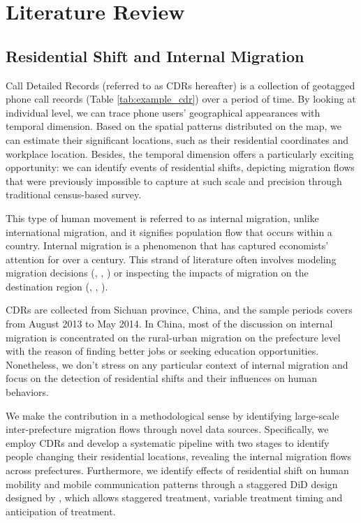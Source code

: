 \chapter{Literature Review}
\section{Residential Shift and Internal Migration}
Call Detailed Records (referred to as CDRs hereafter) is a collection of geotagged phone call records (Table \ref{tab:example_cdr}) over a period of time.
By looking at individual level, we can trace phone users' geographical appearances with temporal dimension.
Based on the spatial patterns distributed on the map, we can estimate their significant locations, such as their residential coordinates and workplace location.
Besides, the temporal dimension offers a particularly exciting opportunity: we can identify events of residential shifts, depicting migration flows that were previously impossible to capture at such scale and precision through traditional census-based survey.


This type of human movement is referred to as internal migration, unlike international migration, and it signifies population flow that occurs within a country.
Internal migration is a phenomenon that has captured economists' attention for over a century.
This strand of literature often involves modeling migration decisions (\cite{hunt2004north}, \cite{espindola2006harris}, \cite{wang2023job}) or inspecting the impacts of migration on the destination region (\cite{boustan2010effect}, \cite{bryan2019aggregate}, \cite{imbert2022migrants}).

CDRs are collected from Sichuan province, China, and the sample periods covers from August 2013 to May 2014. In China, most of the discussion on internal migration is concentrated on the rural-urban migration on the prefecture level with the reason of finding better jobs or seeking education opportunities. Nonetheless, we don't stress on any particular context of internal migration and focus on the detection of residential shifts and their influences on human behaviors.

We make the contribution in a methodological sense by identifying large-scale inter-prefecture migration flows through novel data sources. Specifically, we employ CDRs and develop a systematic pipeline with two stages to identify people changing their residential locations, revealing the internal migration flows across prefectures. Furthermore, we identify effects of residential shift on human mobility and mobile communication patterns through a staggered DiD design designed by \cite{callaway2021difference}, which allows staggered treatment, variable treatment timing and anticipation of treatment.

